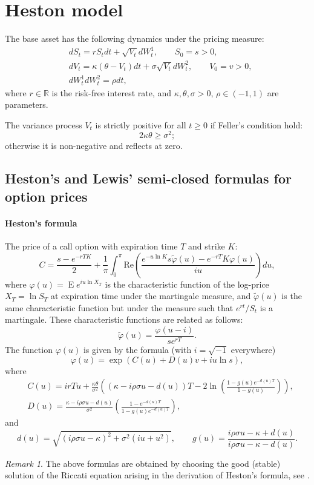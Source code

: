 \documentclass[a4paper,11pt,titlepage]{article}
\newcommand{\R}{\mathbb{R}}
\renewcommand{\phi}{\varphi}
\renewcommand{\Re}{\mathrm{Re}}
\DeclareMathOperator{\E}{E}
\renewcommand{\tilde}{\widetilde}
\theoremstyle{remark}
\newtheorem{remark}{Remark}
\begin{document}
\section{Heston model}
The base asset  has the following dynamics under the pricing measure:
\begin{align*}
&dS_t = r S_t dt + \sqrt{V_t} dW_t^1, \qquad S_0 = s > 0,\\
&dV_t = \kappa(\theta-V_t)dt + \sigma\sqrt{V_t} dW_t^2, \qquad V_0 = v > 0,\\
&dW_t^1 dW_t^2 = \rho dt,
\end{align*}
where $r\in\R$ is the risk-free interest rate, and $\kappa,\theta,\sigma > 0$,
$\rho\in(-1,1)$ are parameters.

The variance process $V_t$ is strictly positive for all $t\ge 0$ if Feller's
condition hold:
\[
2\kappa\theta \ge \sigma^2;
\]
otherwise it is non-negative and reflects at zero.


\subsection{Heston's and Lewis' semi-closed formulas for option prices }
\paragraph{Heston's formula \citep{Heston93}} 
The price of a call option with expiration time $T$ and strike $K$:
\[
C = \frac{s-e^{-rT K}}{2} 
+ \frac1\pi \int_0^\pi \Re\left(
  \frac{e^{-u\ln K} s \tilde\phi(u) - e^{-rT}K \phi(u)}{iu}
\right) du, 
\]
where $\phi(u) = \E e^{iu\ln X_T}$ is the characteristic function of the
log-price $X_T = \ln S_T$ at expiration time under the martingale measure, and
$\tilde\phi(u)$ is the same characteristic function but under the measure such
that $e^{rt}/S_t$ is a martingale. These characteristic functions are related
as follows:
\[
\tilde\phi(u) = \frac{\phi(u-i)}{s e^{rT}}.
\]
The function $\phi(u)$ is given by the formula (with $i=\sqrt{-1}$ everywhere)
\[
\phi(u) = \exp(C(u) + D(u)v + iu \ln s),
\]
where
\begin{align*}
&C(u) = irT u + \frac{\kappa\theta}{\sigma^2}
  \left(
    (\kappa- i\rho\sigma u - d(u)) T -
    2\ln\left( \frac{1-g(u)e^{-d(u)T}}{1-g(u)} \right)
  \right),\\
&D(u) = \frac{\kappa - i\rho\sigma u - d(u)}{\sigma^2}
  \left( \frac{1-e^{-d(u)T}}{1-g(u)e^{-d(u)T}} \right),
\end{align*}
and
\[
d(u) = \sqrt{(i\rho\sigma u - \kappa)^2 + \sigma^2(iu + u^2)}, \qquad
g(u) = \frac{i\rho\sigma u- \kappa +d(u)}{i\rho\sigma u - \kappa -d(u)}.
\]
\begin{remark}
The above formulas are obtained by choosing the good (stable) solution of the
Riccati equation arising in the derivation of Heston's formula, see
\cite{Albrecher+07}.
\end{remark}
\end{document}
